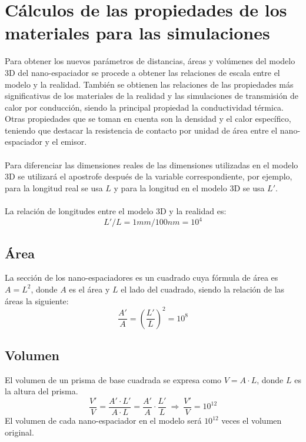 \section{Cálculos de las propiedades de los materiales para las simulaciones}
Para obtener los nuevos parámetros de distancias, áreas y volúmenes del modelo 3D del nano-espaciador se procede a obtener las relaciones de escala entre el modelo y la realidad. También se obtienen las relaciones de las propiedades más significativas de los materiales de la realidad y las simulaciones de transmisión de calor por conducción, siendo la principal propiedad la conductividad térmica. Otras propiedades que se toman en cuenta son la densidad y el calor específico, teniendo que destacar la resistencia de contacto por unidad de área entre el nano-espaciador y el emisor.\\\\
Para diferenciar las dimensiones reales de las dimensiones utilizadas en el modelo 3D se utilizará el apostrofe después de la variable correspondiente, por ejemplo, para la longitud real se usa $L$ y para la longitud en el modelo 3D se usa $L'$.\\\\
La relación de longitudes entre el modelo 3D y la realidad es:
\begin{equation}
{L'}/{L}={1mm}/{100nm}=10^4
\label{eq:relacion_longitud}
\end{equation}
\subsection{Área}
La sección de los nano-espaciadores es un cuadrado cuya fórmula de área es $A=L^2$, donde $A$ es el área y $L$ el lado del cuadrado, siendo la relación de las áreas la siguiente:
\begin{equation}
	\dfrac{A'}{A}=\left(\dfrac{L'}{L}\right)^2=10^8
	\label{eq:relacion_areas}
\end{equation}
\subsection{Volumen}
El volumen de un prisma de base cuadrada se expresa como $V=A\cdot L$, donde $L$ es la altura del prisma.
\begin{equation}
	\dfrac{V'}{V}=\dfrac{A'\cdot L'}{A\cdot L} = 
	\dfrac{A'}{A}\cdot \dfrac{L'}{L} \ \Longrightarrow \ \dfrac{V'}{V} =10^{12}
	\label{eq:relacion_volumen}
\end{equation}
El volumen de cada nano-espaciador en el modelo será $10^{12}$ veces el volumen original.
